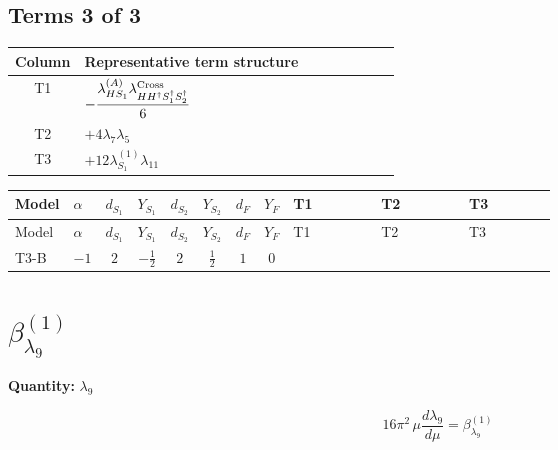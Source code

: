 \documentclass[8pt]{article}
\begin{document}
\begin{landscape}
\subsection*{Terms 3 of 3}
\begin{center}
\begin{tabular}{@{}c >{\raggedright\arraybackslash}p{0.82\linewidth}@{}}
\toprule
Column & Representative term structure \\
\midrule
T1 & \(\displaystyle -\frac{{\lambda_{HS_1}^{(A)}} {\lambda_{H H^\dagger S_1^\dagger S_2^\dagger}^{\rm Cross}}}{6}\) \\
\midrule
T2 & \(\displaystyle +4 {\lambda_7} {\lambda_5}\) \\
\midrule
T3 & \(\displaystyle +12 {\lambda_{S_1}^{(1)}} {\lambda_{11}}\) \\
\midrule
\bottomrule
\end{tabular}
\end{center}
\smallskip
\tiny
\begin{longtable}{@{}llcccccc >{\raggedright\arraybackslash}p{0.21\linewidth} >{\raggedright\arraybackslash}p{0.21\linewidth} >{\raggedright\arraybackslash}p{0.21\linewidth}@{}}
\toprule
Model & $\alpha$ & $d_{S_1}$ & $Y_{S_1}$ & $d_{S_2}$ & $Y_{S_2}$ & $d_F$ & $Y_F$ & T1 & T2 & T3 \\
\midrule
\endfirsthead
\toprule
Model & $\alpha$ & $d_{S_1}$ & $Y_{S_1}$ & $d_{S_2}$ & $Y_{S_2}$ & $d_F$ & $Y_F$ & T1 & T2 & T3 \\
\midrule
\endhead
T3-B & $-1$ & $2$ & $-\frac{1}{2}$ & $2$ & $\frac{1}{2}$ & $1$ & $0$ & \scriptsize\adjustbox{max width=\linewidth}{$\begin{gathered} -\frac{{\lambda_{HS_1}^{(A)}} {\lambda_{H H^\dagger S_1^\dagger S_2^\dagger}^{\rm Cross}}}{6}\end{gathered}$} & \scriptsize\adjustbox{max width=\linewidth}{$\begin{gathered} +4 {\lambda_7} {\lambda_5}\end{gathered}$} & \scriptsize\adjustbox{max width=\linewidth}{$\begin{gathered} +12 {\lambda_{S_1}^{(1)}} {\lambda_{11}}\end{gathered}$} \\
\midrule
\bottomrule
\end{longtable}
\clearpage
\section*{$\beta_{\lambda_{9}}^{(1)}$}
\noindent\textbf{Quantity: }$\lambda_{9}$\par\smallskip
\[16\pi^2\,\mu\frac{d \lambda_{9}}{d\mu}=\beta_{\lambda_{9}}^{(1)}\]

\end{landscape}
\end{document}
